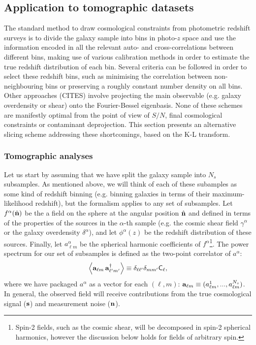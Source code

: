 \documentclass[twocolumn,amsfont,amssymb,amsmath, showpacs,balancelastpage, nofootinbib]{revtex4-1}
\newcommand{\nv}{\hat{\bf n}}
\begin{document}
  \subsection{Application to tomographic datasets}\label{ssec:method.tomographic}
    The standard method to draw cosmological constraints from photometric redshift surveys is to divide the galaxy sample into bins in photo-$z$ space and use the information encoded in all the relevant auto- and cross-correlations between different bins, making use of various calibration methods in order to estimate the true redshift distribution of each bin. Several criteria can be followed in order to select these redshift bins, such as minimising the correlation between non-neighbouring bins or preserving a roughly constant number density on all bins. Other approaches (CITES) involve projecting the main observable (e.g. galaxy overdensity or shear) onto the Fourier-Bessel eigenbasis. None of these schemes are manifestly optimal from the point of view of $S/N$, final cosmological constraints or contaminant deprojection. This section presents an alternative slicing scheme addressing these shortcomings, based on the K-L transform.
    
    \subsubsection{Tomographic analyses}\label{sssec:method.tomographic.st}
      Let us start by assuming that we have split the galaxy sample into $N_s$ subsamples. As mentioned above, we will think of each of these subamples as some kind of redshift binning (e.g. binning galaxies in terms of their maximum-likelihood redshift), but the formalism applies to any set of subsamples. Let $f^\alpha(\nv)$ be the a field on the sphere at the angular position $\nv$ and defined in terms of the properties of the sources in the $\alpha$-th sample (e.g. the cosmic shear field $\gamma^\alpha$ or the galaxy overdensity $\delta^\alpha$), and let $\phi^\alpha(z)$ be the redshift distribution of these sources. Finally, let $a^\alpha_{\ell m}$ be the spherical harmonic coefficients of $f^\alpha$\footnote{Spin-2 fields, such as the cosmic shear, will be decomposed in spin-2 spherical harmonics, however the discussion below holds for fields of arbitrary spin.}. The power spectrum for our set of subsamples is defined as the two-point correlator of $a^\alpha$:
      \begin{equation}
        \left\langle {\bf a}_{\ell m}\,{\bf a}^\dag_{\ell' m'} \right\rangle\equiv\delta_{\ell\ell'}\delta_{mm'}{\sf C}_\ell,
      \end{equation}
      where we have packaged $a^\alpha$ as a vector for each $(\ell,m)$: ${\bf a}_{\ell m}\equiv(a^1_{\ell m},...,a^{N_s}_{\ell m})$. In general, the observed field will receive contributions from the true cosmological signal (${\bf s}$) and measurement noise (${\bf n}$).
  
\end{document}
